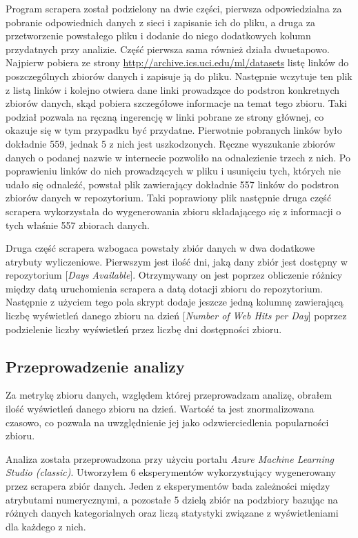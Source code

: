 Program scrapera został podzielony na dwie części, pierwsza odpowiedzialna za pobranie odpowiednich danych z sieci i zapisanie ich do pliku, a druga za przetworzenie powstałego pliku i dodanie do niego dodatkowych kolumn przydatnych przy analizie.
Część pierwsza sama również działa dwuetapowo.
Najpierw pobiera ze strony \url{http://archive.ics.uci.edu/ml/datasets} listę linków do poszczególnych zbiorów danych i zapisuje ją do pliku.
Następnie wczytuje ten plik z listą linków i kolejno otwiera dane linki prowadzące do podstron konkretnych zbiorów danych, skąd pobiera szczegółowe informacje na temat tego zbioru.
Taki podział pozwala na ręczną ingerencję w linki pobrane ze strony głównej, co okazuje się w tym przypadku być przydatne.
Pierwotnie pobranych linków było dokładnie 559, jednak 5 z nich jest uszkodzonych.
Ręczne wyszukanie zbiorów danych o podanej nazwie w internecie pozwoliło na odnalezienie trzech z nich.
Po poprawieniu linków do nich prowadzących w pliku i usunięciu tych, których nie udało się odnaleźć, powstał plik zawierający dokładnie 557 linków do podstron zbiorów danych w repozytorium.
Taki poprawiony plik następnie druga część scrapera wykorzystała do wygenerowania zbioru składającego się z informacji o tych właśnie 557 zbiorach danych.

Druga część scrapera wzbogaca powstały zbiór danych w dwa dodatkowe atrybuty wyliczeniowe.
Pierwszym jest ilość dni, jaką dany zbiór jest dostępny w repozytorium [\emph{Days Available}].
Otrzymywany on jest poprzez obliczenie różnicy między datą uruchomienia scrapera a datą dotacji zbioru do repozytorium.
Następnie z użyciem tego pola skrypt dodaje jeszcze jedną kolumnę zawierającą liczbę wyświetleń danego zbioru na dzień [\emph{Number of Web Hits per Day}] poprzez podzielenie liczby wyświetleń przez liczbę dni dostępności zbioru.

\subsection{Przeprowadzenie analizy}

Za metrykę zbioru danych, względem której przeprowadzam analizę, obrałem ilość wyświetleń danego zbioru na dzień.
Wartość ta jest znormalizowana czasowo, co pozwala na uwzględnienie jej jako odzwierciedlenia popularności zbioru.

Analiza została przeprowadzona przy użyciu portalu \emph{Azure Machine Learning Studio (classic)}.
Utworzyłem 6 eksperymentów wykorzystujący wygenerowany przez scrapera zbiór danych.
Jeden z eksperymentów bada zależności między atrybutami numerycznymi, a pozostałe 5 dzielą zbiór na podzbiory bazując na różnych danych kategorialnych oraz liczą statystyki związane z wyświetleniami dla każdego z nich.

